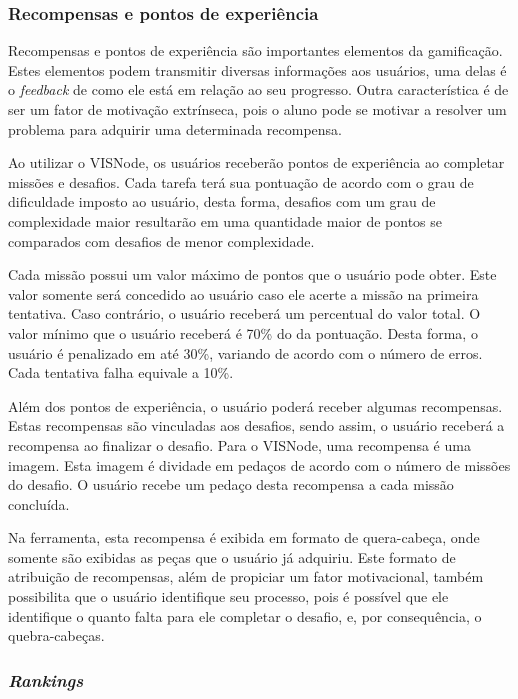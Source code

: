 \documentclass[
	12pt,				%
	oneside,			%
	a4paper,			%
	english,			%
	french,				%
	spanish,			%
	brazil,				%
	]{abntex2}
\begin{document}
\subsubsection{Recompensas e pontos de experiência}

Recompensas e pontos de experiência são importantes elementos da gamificação. Estes elementos podem transmitir diversas informações aos usuários, uma delas é o \textit{feedback} de como ele está em relação ao seu progresso. Outra característica é de ser um fator de motivação extrínseca, pois o aluno pode se motivar a resolver um problema para adquirir uma determinada recompensa.

Ao utilizar o VISNode, os usuários receberão pontos de experiência ao completar missões e desafios. Cada tarefa terá sua pontuação de acordo com o grau de dificuldade imposto ao usuário, desta forma, desafios com um grau de complexidade maior resultarão em uma quantidade maior de pontos se comparados com desafios de menor complexidade.

Cada missão possui um valor máximo de pontos que o usuário pode obter. Este valor somente será concedido ao usuário caso ele acerte a missão na primeira tentativa. Caso contrário, o usuário receberá um percentual do valor total. O valor mínimo que o usuário receberá é 70\% do da pontuação. Desta forma, o usuário é penalizado em até 30\%, variando de acordo com o número de erros. Cada tentativa falha equivale a 10\%.

Além dos pontos de experiência, o usuário poderá receber algumas recompensas. Estas recompensas são vinculadas aos desafios, sendo assim, o usuário receberá a recompensa ao finalizar o desafio. Para o VISNode, uma recompensa é uma imagem. Esta imagem é dividade em pedaços de acordo com o número de missões do desafio. O usuário recebe um pedaço desta recompensa a cada missão concluída.

Na ferramenta, esta recompensa é exibida em formato de quera-cabeça, onde somente são exibidas as peças que o usuário já adquiriu. Este formato de atribuição de recompensas, além de propiciar um fator motivacional, também possibilita que o usuário identifique seu processo, pois é possível que ele identifique o quanto falta para ele completar o desafio, e, por consequência, o quebra-cabeças. 

\subsubsection{\textit{Rankings}}
\end{document}
